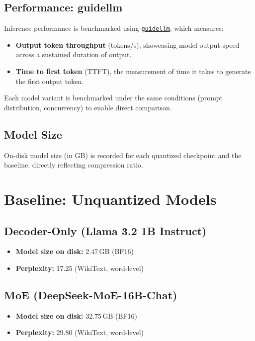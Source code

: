 \documentclass[10pt,twocolumn]{article}
\begin{document}
\subsection{Performance: guidellm}
Inference performance is benchmarked using \href{https://github.com/neuralmagic/guidellm}{\texttt{guidellm}}, which measures:
\begin{itemize}
  \item \textbf{Output token throughput} (tokens/s), showcasing model output speed across a sustained duration of output.
  \item \textbf{Time to first token} (TTFT), the measurement of time it takes to generate the first output token.
\end{itemize}
Each model variant is benchmarked under the same conditions (prompt distribution, concurrency) to enable direct comparison.

\subsection{Model Size}
On-disk model size (in GB) is recorded for each quantized checkpoint and the baseline, directly reflecting compression ratio.

\section{Baseline: Unquantized Models}


\subsection{Decoder-Only (Llama 3.2 1B Instruct)}
\begin{itemize}
  \item \textbf{Model size on disk:} 2.47\,GB (BF16)
  \item \textbf{Perplexity:} 17.25 (WikiText, word-level)
\end{itemize}

\subsection{MoE (DeepSeek-MoE-16B-Chat)}
\begin{itemize}
  \item \textbf{Model size on disk:} 32.75\,GB (BF16)
  \item \textbf{Perplexity:} 29.80 (WikiText, word-level)
\end{itemize}
\end{document}
